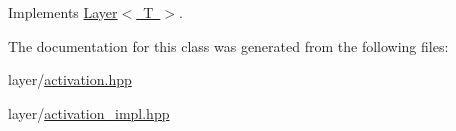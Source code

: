 Implements \mbox{\hyperlink{class_layer_ab15b665c86974b1cf1d7ba4e309cb0e5}{Layer$<$ T $>$}}.



The documentation for this class was generated from the following files\+:\begin{DoxyCompactItemize}
\item 
layer/\mbox{\hyperlink{activation_8hpp}{activation.\+hpp}}\item 
layer/\mbox{\hyperlink{activation__impl_8hpp}{activation\+\_\+impl.\+hpp}}\end{DoxyCompactItemize}

